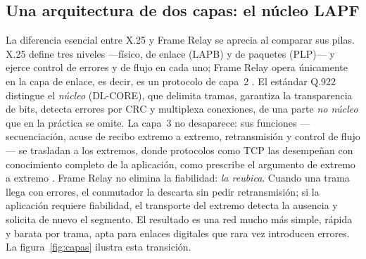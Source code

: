 \documentclass[12pt,a4paper]{article}
\begin{document}
\subsection{Una arquitectura de dos capas: el núcleo LAPF}

La diferencia esencial entre X.25 y Frame Relay se aprecia al comparar sus pilas. X.25 define tres niveles ---físico, de enlace (LAPB) y de paquetes (PLP)--- y ejerce control de errores y de flujo en cada uno; Frame Relay opera únicamente en la capa de enlace, es decir, es un protocolo de capa~2 \cite{ituq922, stallings2014}. El estándar Q.922 distingue el \emph{núcleo} (DL-CORE), que delimita tramas, garantiza la transparencia de bits, detecta errores por CRC y multiplexa conexiones, de una parte \emph{no núcleo} que en la práctica se omite. La capa~3 no desaparece: sus funciones ---secuenciación, acuse de recibo extremo a extremo, retransmisión y control de flujo--- se trasladan a los extremos, donde protocolos como TCP las desempeñan con conocimiento completo de la aplicación, como prescribe el argumento de extremo a extremo \cite{saltzer1984}. Frame Relay no elimina la fiabilidad: \emph{la reubica}. Cuando una trama llega con errores, el conmutador la descarta sin pedir retransmisión; si la aplicación requiere fiabilidad, el transporte del extremo detecta la ausencia y solicita de nuevo el segmento. El resultado es una red mucho más simple, rápida y barata por trama, apta para enlaces digitales que rara vez introducen errores. La figura~\ref{fig:capas} ilustra esta transición.
\end{document}
